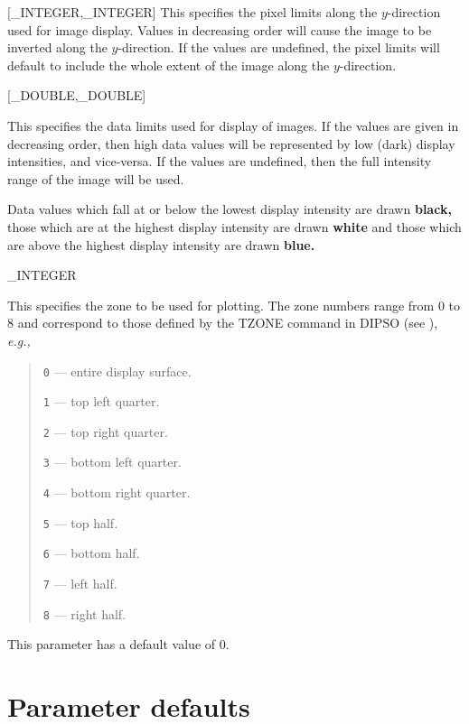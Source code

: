 {
{
   [\_INTEGER,\_INTEGER]
}{
   This specifies the pixel limits along the $y$-direction used for
   image display.
   Values in decreasing order will cause the image to be inverted
   along the $y$-direction.
   If the values are undefined, the pixel limits will default to include
   the whole extent of the image along the $y$-direction.
}

{
   [\_DOUBLE,\_DOUBLE]
}{
   This specifies the data limits used for display of images.
   If the values are given in decreasing order, then high data
   values will be represented by low (dark) display intensities,
   and vice-versa.
   If the values are undefined, then the full intensity range of the
   image will be used.

   Data values which fall at or below the lowest display intensity are drawn
   {\bf black,} those which are at the highest display intensity are drawn
   {\bf white} and those which are above the highest display intensity are
   drawn {\bf blue.}
}

{
   \_INTEGER
}{
   This specifies the zone to be used for plotting.
   The zone numbers range
   from 0 to 8 and correspond to those defined by the TZONE command in
   DIPSO (see ), {\it{e.g.,}}

   \begin {quote}
   \begin {description}
      \item {\tt 0} --- entire display surface.
      \item {\tt 1} --- top left quarter.
      \item {\tt 2} --- top right quarter.
      \item {\tt 3} --- bottom left quarter.
      \item {\tt 4} --- bottom right quarter.
      \item {\tt 5} --- top half.
      \item {\tt 6} --- bottom half.
      \item {\tt 7} --- left half.
      \item {\tt 8} --- right half.
   \end {description}
   \end {quote}

   This parameter has a default value of 0.
}
}

\newpage

\appendix
\section{\label{se:parameter_defaults}Parameter
          defaults}

